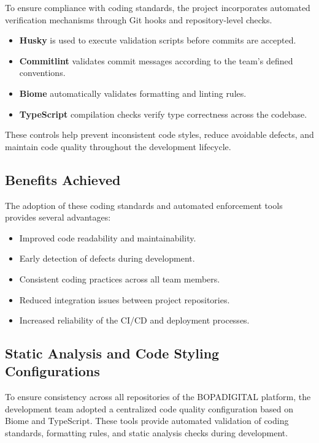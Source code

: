\documentclass[letterpaper%
, oneside%
, 12pt%
, memoireprojet%
, english%
,creativecommons,hyperref, withAlgo2e %
]{thETS}
\begin{document}
To ensure compliance with coding standards, the project incorporates automated verification mechanisms through Git hooks and repository-level checks.

\begin{itemize}
\item \textbf{Husky} is used to execute validation scripts before commits are accepted.
\item \textbf{Commitlint} validates commit messages according to the team's defined conventions.
\item \textbf{Biome} automatically validates formatting and linting rules.
\item \textbf{TypeScript} compilation checks verify type correctness across the codebase.
\end{itemize}

These controls help prevent inconsistent code styles, reduce avoidable defects, and maintain code quality throughout the development lifecycle.

\subsection{Benefits Achieved}

The adoption of these coding standards and automated enforcement tools provides several advantages:

\begin{itemize}
\item Improved code readability and maintainability.
\item Early detection of defects during development.
\item Consistent coding practices across all team members.
\item Reduced integration issues between project repositories.
\item Increased reliability of the CI/CD and deployment processes.
\end{itemize}


\subsection{Static Analysis and Code Styling Configurations}

To ensure consistency across all repositories of the BOPADIGITAL platform, the development team adopted a centralized code quality configuration based on Biome and TypeScript. These tools provide automated validation of coding standards, formatting rules, and static analysis checks during development.
\end{document}
